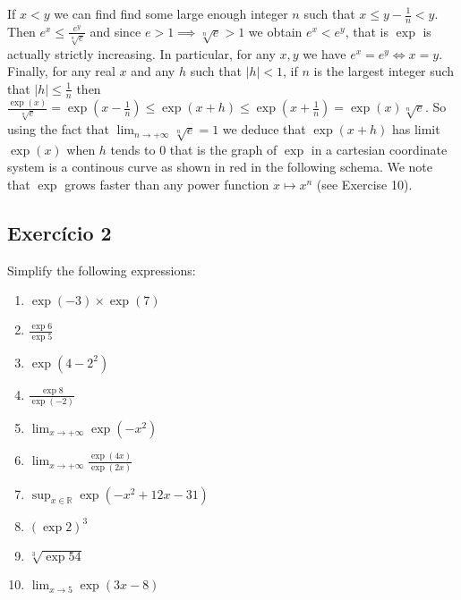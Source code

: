 If $x < y$ we can find find some large enough integer $n$ such that
$x \leq y - \frac{1}{n} < y$. Then $e^x \leq \frac{e^y}{\sqrt[n]{e}}$
and since $e > 1 \implies \sqrt[n]{e} > 1$ we obtain $e^x < e^y$, that is
$\exp$ is actually strictly increasing. In particular, for any $x,y$
we have $e^x = e^y \iff x = y$. Finally, for any real $x$ and any $h$
such that $|h| < 1$, if $n$ is the largest integer such that
$|h| \leq \frac{1}{n}$ then
$\frac{\exp{(x)}}{\sqrt[n]{e}} = \exp{\left(x - \frac{1}{n}\right)}
\leq \exp{(x+h)}
\leq \exp{\left(x + \frac{1}{n}\right)} = \exp{(x)} \sqrt[n]{e}$.
So using the fact that $\lim_{n \rightarrow +\infty} \sqrt[n]{e} = 1$ we deduce that
$\exp{(x+h)}$ has limit $\exp{(x)}$ when $h$ tends to $0$
that is the graph of $\exp$ in
a cartesian coordinate system is a continous curve as shown
in red in the following schema. We note that $\exp$ grows faster than
any power function $x \mapsto x^n$ (see Exercise 10).

\begin{center}
\end{center}

\subsection*{Exercício 2}

Simplify the following expressions:

\begin{enumerate}
\item $\exp{(-3)} \times \exp{(7)}$
\item $\frac{\exp{6}}{\exp{5}}$
\item $\exp{(4-2^2)}$
\item $\frac{\exp{8}}{\exp{(-2)}}$
\item $\lim_{x \rightarrow +\infty} \exp{(-x^2)}$
\item $\lim_{x \rightarrow +\infty} \frac{\exp{(4x)}}{\exp{(2x)}}$
\item $\sup_{x \in \mathbb R} \exp{(-x^2+12x-31)}$
\item ${(\exp{2})}^3$
\item $\sqrt[3]{\exp{54}}$
\item $\lim_{x \rightarrow 5} \exp{(3x - 8)}$
\end{enumerate}

